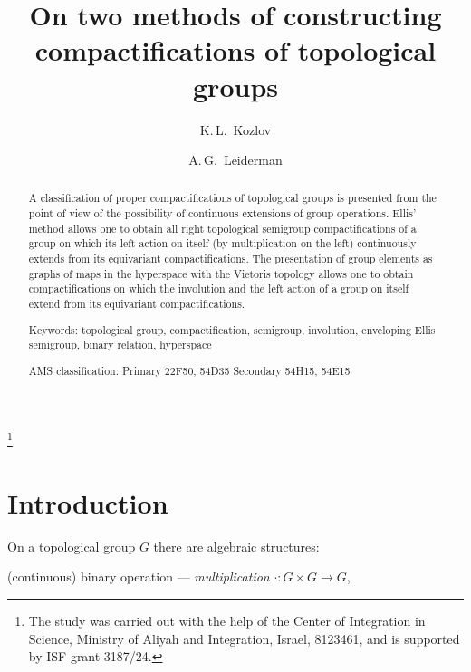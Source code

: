 \documentclass{amsart}
\begin{document}

\title{On two methods of constructing compactifications of topological groups}\thanks{The study was carried out with the help of the Center of Integration in Science, Ministry of Aliyah and Integration, Israel,  8123461, and is supported by ISF grant 3187/24.}

\author{K.\,L.~Kozlov}
\address{Department of Mathematics, Ben-Gurion University of the Negev, Beer Sheva, Israel}
\author{A.\,G.~Leiderman}
\address{Department of Mathematics, Ben-Gurion University of the Negev, Beer Sheva, Israel}



\date{}

 \maketitle
 
\begin{abstract}

A classification of proper compactifications of topological groups is presented from the point of view of the possibility of continuous extensions of group operations. Ellis' method allows one to obtain all right topological semigroup compactifications of a group on which its left action on itself (by multiplication on the left) continuously extends from its equivariant compactifications. The presentation of group elements as graphs of maps in the hyperspace with the Vietoris topology allows one to obtain compactifications on which the involution and the left action of a group on itself extend from its equivariant compactifications.

 \medskip
 
Keywords: topological group, compactification, semigroup, involution, enveloping Ellis semigroup, binary relation, hyperspace

\medskip

AMS classification: Primary 22F50, 54D35 Secondary 54H15, 54E15
\end{abstract}

\section{Introduction} 

On a topological group $G$ there are algebraic structures: 

\medskip

(continuous) binary operation --- {\it multiplication} $\cdot: G\times G\to G$,
\end{document}

